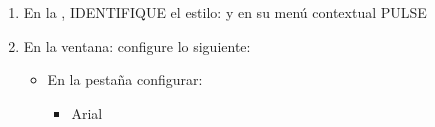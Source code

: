\documentclass[letterpaper,10pt,spanish]{sphinxmanual}
\let\sphinxpxdimen\pdfpxdimen\else\newdimen\sphinxpxdimen
\begin{document}
\begin{enumerate}
\begin{savenotes}
\begin{tabulary}{\linewidth}[t]{T}
\begin{sphinxfigure-in-table}
\centering

\noindent\sphinxincludegraphics[width=630\sphinxpxdimen]{{image23}.png}
\end{sphinxfigure-in-table}\relax
\\
\sphinxbottomrule
\end{tabulary}
\sphinxtableafterendhook\par
\sphinxattableend\end{savenotes}
\begin{itemize}
\item {} 
\sphinxAtStartPar
En la pestaña  configurar:
\begin{itemize}
\item {} 
\sphinxAtStartPar
{} Times New Roman

\item {} 
\sphinxAtStartPar
{} 14pt

\end{itemize}

\item {} 
\sphinxAtStartPar
En la pestaña  configurar:
\begin{itemize}
\item {} 
\sphinxAtStartPar
{} Nivel 1

\item {} 
\sphinxAtStartPar
{} Bolo \sphinxhyphen{}

\end{itemize}

\item {} 
\sphinxAtStartPar
PULSAR el botón .

\end{itemize}

\item {} 
\sphinxAtStartPar
En la , IDENTIFIQUE el estilo:  y en su menú contextual PULSE 

\item {} 
\sphinxAtStartPar
En la ventana:  configure lo siguiente:
\begin{itemize}
\item {} 
\sphinxAtStartPar
En la pestaña  configurar:
\begin{itemize}
\item {} 
\sphinxAtStartPar
{} Arial


\end{itemize}
\end{itemize}
\end{enumerate}
\end{document}
